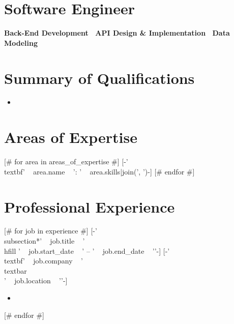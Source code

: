 \documentclass[a4paper,10pt]{article}
\begin{document}
\begin{center}
\end{center}

\section*{Software Engineer}
\begin{center}
\textbf{Back-End Development \textbar\ API Design \& Implementation \textbar\ Data Modeling}
\end{center}

\section*{Summary of Qualifications}
\begin{itemize}[itemsep=0em]
[# for qualification in summary_of_qualifications #]
    \item [-qualification-] 
[# endfor #]
\end{itemize}

\section*{Areas of Expertise}
\begin{minipage}{\textwidth}
\raggedright
[# for area in areas_of_expertise #]
    [-'\\textbf{' ~ area.name ~ ':} ' ~ area.skills|join(', ')-]
[# endfor #]
\end{minipage}

\section*{Professional Experience}
[# for job in experience #]
    [-'\\subsection*{' ~ job.title ~ '\\hfill ' ~ job.start_date ~ ' -- ' ~ job.end_date ~ '}'-]
[-'\\textbf{' ~ job.company ~ ' \\textbar\\ ' ~ job.location ~ '}'-]
\begin{itemize}[itemsep=0em]
  [# for responsibility in job.responsibilities #]
  \item [-responsibility-]
  [# endfor #]
\end{itemize}
[# endfor #]
\end{document}
